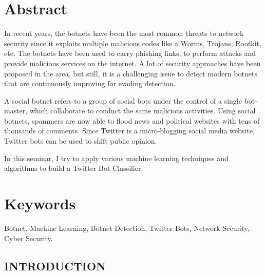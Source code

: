 \documentclass[a4paper, 12pt]{article}
\begin{document}
\newpage
\tableofcontents

\newpage
\listoftables
\listoffigures

\newpage

\section*{Abstract}

\hspace{0.5cm}In recent years, the botnets have been the most common threats to network security since it exploits multiple malicious codes like a Worms, Trojans, Rootkit, etc. The botnets have been used to carry phishing links, to perform attacks and provide malicious services on the internet. A lot of security approaches have been proposed in the area, but still, it is a challenging issue to detect modern botnets that are continuously improving for evading detection.
\par 
A social botnet refers to a group of social bots under the control of a single bot-master, which collaborate to conduct the same malicious activities. Using social botnets, spammers are now able to flood news and political websites with tens of thousands of comments. Since Twitter is a micro-blogging social media website, Twitter bots can be used to shift public opinion.
\par
In this seminar, I try to apply various machine learning techniques and algorithms to build a Twitter Bot Classifier.
\section*{Keywords}
Botnet, Machine Learning, Botnet Detection, Twitter Bots, Network Security, Cyber Security.
\newpage
{}


\begin{center}
\section{INTRODUCTION}
\end{center}
\end{document}
